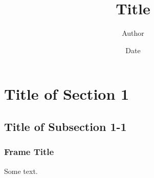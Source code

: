 \documentclass{beamer}
\title{Title}
\author{Author}
\institute{Institute}
\date{Date}
\begin{document}
\section{Title of Section 1}
\subsection{Title of Subsection 1-1}

\begin{frame}
\frametitle{Frame Title}
Some text.
\end{frame}
\end{document}
